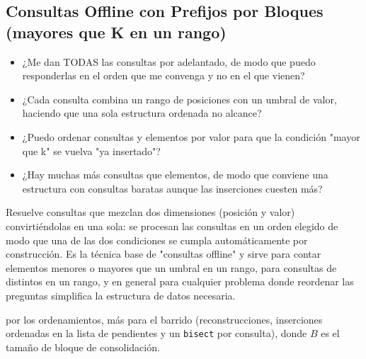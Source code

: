 \subsection{Consultas Offline con Prefijos por Bloques (mayores que K en un rango)}
\label{alg:3-13}


\begin{itemize}
\item ¿Me dan TODAS las consultas por adelantado, de modo que puedo responderlas en el orden que me convenga y no en el que vienen?
\item ¿Cada consulta combina un rango de posiciones con un umbral de valor, haciendo que una sola estructura ordenada no alcance?
\item ¿Puedo ordenar consultas y elementos por valor para que la condición "mayor que k" se vuelva "ya insertado"?
\item ¿Hay muchas más consultas que elementos, de modo que conviene una estructura con consultas baratas aunque las inserciones cuesten más?
\end{itemize}

 Resuelve consultas que mezclan dos dimensiones (posición y valor) convirtiéndolas en una sola: se procesan las consultas en un orden elegido de modo que una de las dos condiciones se cumpla automáticamente por construcción. Es la técnica base de "consultas offline" y sirve para contar elementos menores o mayores que un umbral en un rango, para consultas de distintos en un rango, y en general para cualquier problema donde reordenar las preguntas simplifica la estructura de datos necesaria.

  por los ordenamientos, más  para el barrido (reconstrucciones, inserciones ordenadas en la lista de pendientes y un \texttt{bisect} por consulta), donde $B$ es el tamaño de bloque de consolidación.

